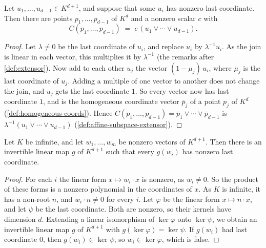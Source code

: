 \begin{lemma}
  \label{lem:extensor-affine-representation}
  \leanok
  Let $u_1, \dots, u_{d-1} \in K^{d+1}$, and suppose that some $u_i$
  has nonzero last coordinate. Then there are points
  $p_1, \dots, p_{d-1}$ of $K^d$ and a nonzero scalar $c$ with
  \[
    C(p_1, \dots, p_{d-1}) \;=\; c\,(u_1 \vee \cdots \vee u_{d-1}).
  \]
\end{lemma}
\begin{proof}
  \leanok
  Let $\lambda \neq 0$ be the last coordinate of $u_i$, and replace
  $u_i$ by $\lambda^{-1} u_i$. As the join is linear in each vector,
  this multiplies it by $\lambda^{-1}$ (the remarks after
  \cref{def:extensor}). Now add to each other $u_j$ the vector
  $(1 - \mu_j)\, u_i$, where $\mu_j$ is the last coordinate of $u_j$.
  Adding a multiple of one vector to another does not change the join,
  and $u_j$ gets the last coordinate $1$. So every vector now has last
  coordinate $1$, and is the homogeneous coordinate vector $\bar p_j$
  of a point $p_j$ of $K^d$ (\cref{def:homogeneous-coords}). Hence
  $C(p_1, \dots, p_{d-1}) = \bar p_1 \vee \cdots \vee \bar p_{d-1}$ is
  $\lambda^{-1} (u_1 \vee \cdots \vee u_{d-1})$
  (\cref{def:affine-subspace-extensor}).
\end{proof}

\begin{lemma}
  \label{lem:simultaneous-affine-position}
  \leanok
  Let $K$ be infinite, and let $w_1, \dots, w_m$ be nonzero vectors of
  $K^{d+1}$. Then there is an invertible linear map $g$ of $K^{d+1}$
  such that every $g(w_i)$ has nonzero last coordinate.
\end{lemma}
\begin{proof}
  \leanok
  For each $i$ the linear form $x \mapsto w_i \cdot x$ is nonzero, as
  $w_i \neq 0$. So the product of these forms is a nonzero polynomial
  in the coordinates of $x$. As $K$ is infinite, it has a non-root $n$,
  and $w_i \cdot n \neq 0$ for every $i$. Let $\varphi$ be the linear
  form $x \mapsto n \cdot x$, and let $\psi$ be the last coordinate.
  Both are nonzero, so their kernels have dimension $d$. Extending a
  linear isomorphism of $\ker \varphi$ onto $\ker \psi$, we obtain an
  invertible linear map $g$ of $K^{d+1}$ with
  $g(\ker \varphi) = \ker \psi$. If $g(w_i)$ had last coordinate $0$,
  then $g(w_i) \in \ker \psi$, so $w_i \in \ker \varphi$, which is
  false.
\end{proof}

